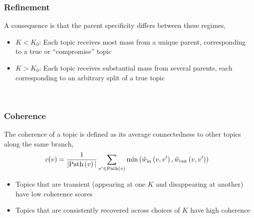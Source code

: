 \documentclass[hyperref={colorlinks=true, linkcolor=violet, citecolor=SeaGreen}]{beamer}
\begin{document}
\begin{frame}
  \frametitle{Refinement}
  A consequence is that the parent specificity differs between these
  regimes,
  \begin{itemize}
    \item $K < K_0$: Each topic receives most mass from a unique parent,
    corresponding to a true or ``compromise'' topic
    \item $K > K_0$: Each topic receives substantial mass from several parents,
    each corresponding to an arbitrary split of a true topic
  \end{itemize}

  \begin{figure}
$\medspace\medspace\medspace$
  \end{figure}

\end{frame}

\begin{frame}
  \frametitle{Coherence}
  The coherence of a topic is defined as its average connectedness to other
  topics along the same branch,
  \begin{align*}
    c(v) = \frac{1}{|\text{Path}\left(v\right)|} \sum_{v' \in \text{Path}\left(v\right)} \min\left(\tilde w_{\text{in}}\left(v, v'\right), \tilde w_{\text{out}}\left(v, v'\right) \right)
  \end{align*}
  \begin{itemize}
    \item Topics that are transient (appearing at one $K$ and disappearing at
    another) have low coherence scores
    \item Topics that are consistently recovered across choices of $K$ have high
    coherence
  \end{itemize}

\end{frame}
\end{document}

